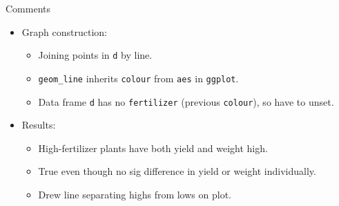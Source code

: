 \documentclass[
  ignorenonframetext,
]{beamer}
\providecommand{\tightlist}{%
  \setlength{\itemsep}{0pt}\setlength{\parskip}{0pt}}
\begin{document}
\begin{frame}[fragile]{Comments}
\protect\hypertarget{comments-21}{}

\begin{itemize}
\tightlist
\item
  Graph construction:

  \begin{itemize}
  \tightlist
  \item
    Joining points in \texttt{d} by line.
  \item
    \texttt{geom\_line} inherits \texttt{colour} from \texttt{aes} in
    \texttt{ggplot}.
  \item
    Data frame \texttt{d} has no \texttt{fertilizer} (previous
    \texttt{colour}), so have to unset.
  \end{itemize}
\item
  Results:

  \begin{itemize}
  \item
    High-fertilizer plants have both yield and weight high.
  \item
    True even though no sig difference in yield or weight individually.
  \item
    Drew line separating highs from lows on plot.
  \end{itemize}
\end{itemize}

\end{frame}
\end{document}
